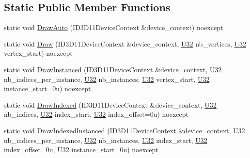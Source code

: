 \subsection*{Static Public Member Functions}
\begin{DoxyCompactItemize}
\item 
static void \mbox{\hyperlink{structmage_1_1rendering_1_1_pipeline_a30cdc51051e3fcab0d3a9c36efad40e4}{Draw\+Auto}} (I\+D3\+D11\+Device\+Context \&device\+\_\+context) noexcept
\item 
static void \mbox{\hyperlink{structmage_1_1rendering_1_1_pipeline_acc764fee84589a85e0e2df129b34b137}{Draw}} (I\+D3\+D11\+Device\+Context \&device\+\_\+context, \mbox{\hyperlink{namespacemage_aa5d6eaabaac3cdd01873d6a3d27e90f3}{U32}} nb\+\_\+vertices, \mbox{\hyperlink{namespacemage_aa5d6eaabaac3cdd01873d6a3d27e90f3}{U32}} vertex\+\_\+start) noexcept
\item 
static void \mbox{\hyperlink{structmage_1_1rendering_1_1_pipeline_af0d8580b1c0a672c3fc9558dc19408a3}{Draw\+Instanced}} (I\+D3\+D11\+Device\+Context \&device\+\_\+context, \mbox{\hyperlink{namespacemage_aa5d6eaabaac3cdd01873d6a3d27e90f3}{U32}} nb\+\_\+indices\+\_\+per\+\_\+instance, \mbox{\hyperlink{namespacemage_aa5d6eaabaac3cdd01873d6a3d27e90f3}{U32}} nb\+\_\+instances, \mbox{\hyperlink{namespacemage_aa5d6eaabaac3cdd01873d6a3d27e90f3}{U32}} vertex\+\_\+start, \mbox{\hyperlink{namespacemage_aa5d6eaabaac3cdd01873d6a3d27e90f3}{U32}} instance\+\_\+start=0u) noexcept
\item 
static void \mbox{\hyperlink{structmage_1_1rendering_1_1_pipeline_a8be1904461ee6bcd5e4b5b72d5cb79a8}{Draw\+Indexed}} (I\+D3\+D11\+Device\+Context \&device\+\_\+context, \mbox{\hyperlink{namespacemage_aa5d6eaabaac3cdd01873d6a3d27e90f3}{U32}} nb\+\_\+indices, \mbox{\hyperlink{namespacemage_aa5d6eaabaac3cdd01873d6a3d27e90f3}{U32}} index\+\_\+start, \mbox{\hyperlink{namespacemage_aa5d6eaabaac3cdd01873d6a3d27e90f3}{U32}} index\+\_\+offset=0u) noexcept
\item 
static void \mbox{\hyperlink{structmage_1_1rendering_1_1_pipeline_a23ab5aea07be3bca0d9d7900518104b7}{Draw\+Indexed\+Instanced}} (I\+D3\+D11\+Device\+Context \&device\+\_\+context, \mbox{\hyperlink{namespacemage_aa5d6eaabaac3cdd01873d6a3d27e90f3}{U32}} nb\+\_\+indices\+\_\+per\+\_\+instance, \mbox{\hyperlink{namespacemage_aa5d6eaabaac3cdd01873d6a3d27e90f3}{U32}} nb\+\_\+instances, \mbox{\hyperlink{namespacemage_aa5d6eaabaac3cdd01873d6a3d27e90f3}{U32}} index\+\_\+start, \mbox{\hyperlink{namespacemage_aa5d6eaabaac3cdd01873d6a3d27e90f3}{U32}} index\+\_\+offset=0u, U32 instance\+\_\+start=0u) noexcept

\end{DoxyCompactItemize}
